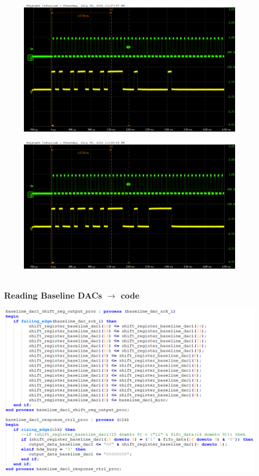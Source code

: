 \documentclass[aspectratio=169]{beamer}
\begin{document}
\begin{frame}
\begin{columns}
		\begin{center}
			\begin{figure}
				\includegraphics[width=0.55 \textwidth]{IMG/probe/09-08-2021_ch17-write01-baselinedac1.png}
				\caption{}
			\end{figure}
			\begin{figure}
				\includegraphics[width=0.55 \textwidth]{IMG/probe/09-08-2021_ch17-write63-baselinedac1.png}
				\caption{}
			\end{figure}	
		\end{center}
	\end{columns}
	\end{frame}

	\begin{frame}
	\frametitle{Reading Baseline DACs $\rightarrow$ code}
		\begin{center}
			\includegraphics[width=0.6 \textwidth]{IMG/FSM_Read_States.png}
		\end{center}
	\end{frame}
\end{document}
